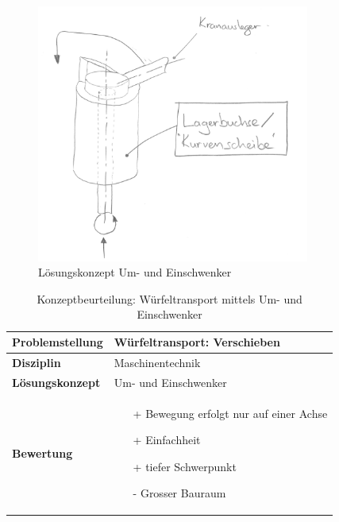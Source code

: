 \documentclass[../../../main.tex]{subfiles}
\begin{document}
\begin{figure}[H] %
    \centering
    \includegraphics[width=0.8\textwidth]{Umschenker}
    \caption{Lösungskonzept Um- und Einschwenker}
    \label{fig:umschenker}
\end{figure}

\begin{flushleft}
    \begin{table}[h]
    \begin{tabular}{ | l | p{11cm} |}
    \hline
    \textbf{Problemstellung} & Würfeltransport: Verschieben \\ \hline
    \textbf{Disziplin} & Maschinentechnik \\ \hline
    \textbf{Lösungskonzept} &  Um- und Einschwenker \\ \hline
    \textbf{Bewertung} &  \begin{itemize}
                            \item[+] Bewegung erfolgt nur auf einer Achse
                            \item[+] Einfachheit
                            \item[+] tiefer Schwerpunkt
                            \item[-] Grosser Bauraum
                          \end{itemize} \\ \hline
    \end{tabular}
    \caption{Konzeptbeurteilung: Würfeltransport mittels Um- und Einschwenker}
    \label{tab:konzept_wurfeltrransport_umschwenker}
\end{table}
\end{flushleft}
\end{document}
